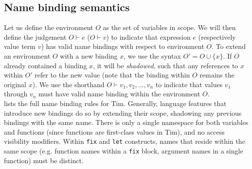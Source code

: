\subsection{Name binding semantics}
\label{sec:tim_name_binding}
Let us define the environment $ O $ as the set of variables in scope. We will then define the judgement $ O \vdash e $ ($ O \vdash v $) to indicate that expression $ e $ (respectively value term $ v $) has valid name bindings with respect to environment $ O $. To extend an environment $ O $ with a new binding $ x $, we use the syntax $ O' = O \cup \{ x \} $. If $ O $ already contained a binding $ x $, it will be \textit{shadowed}, such that any references to $ x $ within $ O' $ refer to the new value (note that the binding within $ O $ remains the original $ x $). We use the shorthand $ O \vdash v_1, v_2, ..., v_n $ to indicate that values $ v_1 $ through $ v_n $ must have valid name binding within the environment $ O $.\\

 lists the full name binding rules for Tim. Generally, language features that introduce new bindings do so by extending their scope, shadowing any previous bindings with the same name. There is only a single namespace for both variables and functions (since functions are first-class values in Tim), and no access visibility modifiers. Within \texttt{fix} and \texttt{let} constructs, names that reside within the same scope (e.g. function names within a \texttt{fix} block, argument names in a single function) must be distinct.

